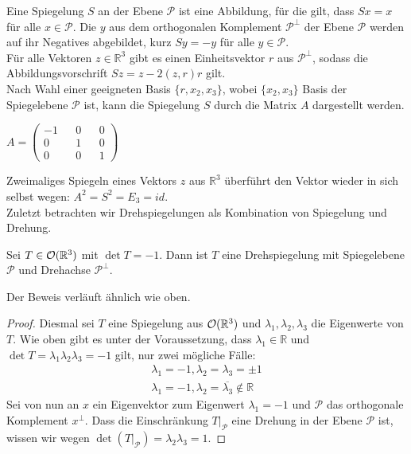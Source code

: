 \begin{bem}
    Eine Spiegelung $S$ an der Ebene $\mathcal{P}$ ist eine Abbildung, für die gilt, dass $Sx=x$ für alle $x \in \mathcal{P}$. Die $y$ aus dem orthogonalen Komplement $\mathcal{P}^{\perp}$ der Ebene $\mathcal{P}$ werden auf ihr Negatives abgebildet, kurz $Sy=-y$ für alle $y\in \mathcal{P}$.\\
    Für alle Vektoren $z \in \mathbb{R}^3$ gibt es einen Einheitsvektor $r$ aus $\mathcal{P}^{\perp}$, sodass die Abbildungsvorschrift $Sz = z -2(z,r)r$ gilt.\\
Nach Wahl einer geeigneten Basis $\{r, x_2, x_3\}$, wobei $\{x_2, x_3\}$ Basis der Spiegelebene $\mathcal{P}$ ist, kann die Spiegelung $S$ durch die Matrix $A$ dargestellt werden.
\begin{center}
  $A= \begin{pmatrix}
        -1 && 0 && 0 \\
        0 && 1 && 0 \\
        0 && 0 && 1
       \end{pmatrix}$
 \end{center}
 \end{bem}
 Zweimaliges Spiegeln eines Vektors $z$ aus $\mathbb{R}^3$ überführt den Vektor wieder in sich selbst wegen: $A^2 = S^2 = E_3 = id$.\\
 Zuletzt betrachten wir Drehspiegelungen als Kombination von Spiegelung und Drehung.
 \begin{theorem}
 Sei $T\in{\mathcal{O}(\mathbb{R}^3)}$ mit $\det T = -1$. Dann ist $T$ eine Drehspiegelung mit Spiegelebene $\mathcal{P}$ und Drehachse $\mathcal{P}^{\perp}$.
 \end{theorem}
 Der Beweis verläuft ähnlich wie oben.
 \begin{proof}
 Diesmal sei $T$ eine Spiegelung aus ${\mathcal{O}(\mathbb{R}^3)}$ und $\lambda_1,\lambda_2, \lambda_3$ die Eigenwerte von $T$. Wie oben gibt es unter der Voraussetzung, dass $\lambda_1 \in \mathbb{R}$  und $\det T = \lambda_1\lambda_2\lambda_3=-1$ gilt, nur zwei mögliche Fälle:
 \begin{align}
   \lambda_1=-1, \lambda_2=\lambda_3=\pm1 \\
   \lambda_1=-1, \lambda_2=\overline{\lambda_3}\notin \mathbb{R}
  \end{align}
 Sei von nun an $x$ ein Eigenvektor zum Eigenwert $\lambda_1=-1$ und $\mathcal{P}$ das orthogonale Komplement $x^{\perp}$. Dass die Einschränkung $T|_\mathcal{P}$ eine Drehung in der Ebene $\mathcal{P}$ ist, wissen wir wegen $\det(T|_\mathcal{P}) = \lambda_2\lambda_3=1.$
 \end{proof}
